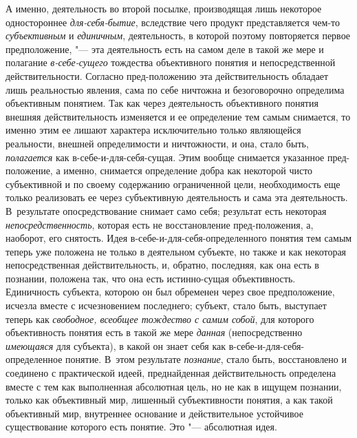 {{А именно, деятельность во второй посылке, производящая лишь
некоторое одностороннее
{\em для-себя-бытие},
вследствие чего продукт представляется чем-то
{\em субъективным} и
{\em единичным},
деятельность, в которой поэтому повторяется первое
предположение, "--- эта деятельность есть на самом деле в такой
же мере и полагание {\em в-себе-сущего}
тождества объективного понятия и непосредственной
действительности. Согласно пред-положению эта действительность
обладает лишь реальностью явления, сама по себе ничтожна и безоговорочно
определима объективным понятием. Так как через деятельность объективного
понятия внешняя действительность изменяется и ее определение тем самым
снимается, то именно этим ее лишают характера исключительно только
являющейся реальности, внешней определимости и ничтожности, и она, стало
быть, {\em полагается}
как в-себе-и-для-себя-сущая. Этим вообще снимается указанное
пред-положение, а именно, снимается определение добра как некоторой чисто
субъективной и по своему содержанию ограниченной цели, необходимость еще
только реализовать ее через субъективную деятельность и сама эта
деятельность. В~результате опосредствование снимает само себя; результат
есть некоторая
{\em непосредственность},
которая есть не восстановление пред-положения, а, наоборот,
его снятость. Идея в-себе-и-для-себя-определенного понятия тем самым теперь
уже положена не только в деятельном субъекте, но также и как некоторая
непосредственная действительность, и, обратно, последняя, как она есть в
познании, положена так, что она есть истинно-сущая объективность.
Единичность субъекта, которою он был обременен через свое предположение,
исчезла вместе с исчезновением последнего; субъект, стало быть, выступает
теперь как {\em свободное, всеобщее
тождество с самим собой}, для которого объективность понятия
есть в такой же мере {\em данная}
(непосредственно
{\em имеющаяся} для
субъекта), в какой он знает себя как в-себе-и-для-себя-определенное
понятие. В~этом результате
{\em познание}, стало
быть, восстановлено и соединено с практической идеей,
преднайденная действительность определена вместе с тем как выполненная
абсолютная цель, но не как в ищущем познании, только как объективный мир,
лишенный субъективности понятия, а как такой объективный мир, внутреннее
основание и действительное устойчивое существование которого есть понятие.
Это "--- абсолютная идея.

}}
